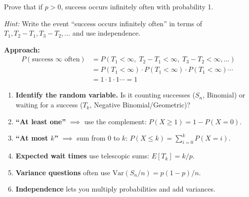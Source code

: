 \documentclass[11pt]{article}
\begin{document}
\vspace{0.4cm}

\begin{practicebox}
Prove that if $p > 0$, success occurs infinitely often with probability 1.

\emph{Hint:} Write the event ``success occurs infinitely often'' in terms of $T_1, T_2 - T_1, T_3 - T_2, \ldots$ and use independence.
\end{practicebox}

\textbf{Approach:}
\begin{align*}
P(\text{success } \infty \text{ often}) &= P(T_1 < \infty, \; T_2 - T_1 < \infty, \; T_3 - T_2 < \infty, \ldots) \\
&= P(T_1 < \infty) \cdot P(T_1 < \infty) \cdot P(T_1 < \infty) \cdots \tag{independence, same distribution} \\
&= 1 \cdot 1 \cdot 1 \cdots = 1
\end{align*}

\vspace{0.4cm}

\begin{conceptbox}
\begin{enumerate}[nosep]
  \item \textbf{Identify the random variable.} Is it counting successes ($S_n$, Binomial) or waiting for a success ($T_k$, Negative Binomial/Geometric)?
  \item \textbf{``At least one''} $\implies$ use the complement: $P(X \geq 1) = 1 - P(X = 0)$.
  \item \textbf{``At most $k$''} $\implies$ sum from 0 to $k$: $P(X \leq k) = \sum_{i=0}^{k} P(X = i)$.
  \item \textbf{Expected wait times} use telescopic sums: $E[T_k] = k/p$.
  \item \textbf{Variance questions} often use $\text{Var}(S_n/n) = p(1-p)/n$.
  \item \textbf{Independence} lets you multiply probabilities and add variances.
\end{enumerate}
\end{conceptbox}
\end{document}

